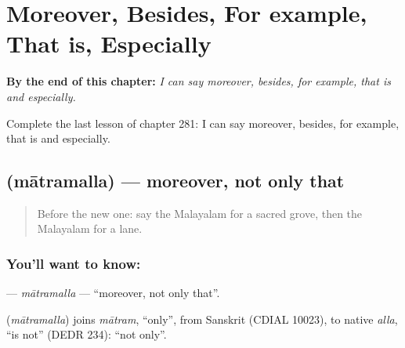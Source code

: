 
\chapter{Moreover, Besides, For example, That is, Especially}
\label{ch:ml-moreover-besides-for-example-that-is-especially}

\begin{chapteropening}
\textbf{By the end of this chapter:} \emph{I can say moreover, besides, for example, that is and especially.}

Complete the last lesson of chapter 281: I can say moreover, besides, for example, that is and especially.
\end{chapteropening}

\section[\texorpdfstring{\ml{മാത്രമല്ല} (mātramalla)}{മാത്രമല്ല (mātramalla)}]{ (mātramalla) — moreover, not only that}

\label{lesson:ML-C281-matramalla}



\begin{quote}
Before the new one: say the Malayalam for a sacred grove, then the Malayalam for a lane.
\end{quote}

\subsection*{You'll want to know: }
\textbf{} — \emph{mātramalla} — \textquotedblleft{}moreover, not only that\textquotedblright{}.

\begin{cousinweb}
\textbf{} (\emph{mātramalla}) joins \emph{mātram}, \textquotedblleft{}only\textquotedblright{}, from Sanskrit (CDIAL 10023), to native \emph{alla}, \textquotedblleft{}is not\textquotedblright{} (DEDR 234): \textquotedblleft{}not only\textquotedblright{}.
\end{cousinweb}

